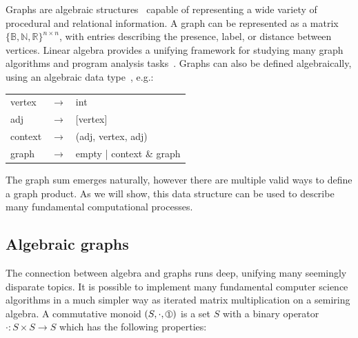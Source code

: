 \documentclass[sigplan,10pt,review,anonymous]{acmart}
\begin{document}
Graphs are algebraic structures~\cite{weisfeiler1968reduction} capable of representing a wide variety of procedural and relational information. A graph can be represented as a matrix $\{\mathbb{B}, \mathbb{N}, \mathbb{R}\}^{n\times n}$, with entries describing the presence, label, or distance between vertices. Linear algebra provides a unifying framework for studying many graph algorithms and program analysis tasks~\citep{kepner2011graph}. Graphs can also be defined algebraically, using an algebraic data type~\cite{erwig2001inductive, mokhov2017algebraic}, e.g.:\\

\begin{center}
\begin{table}[H]
\begin{tabular}{lcl}
  vertex  & $\rightarrow$ & int \\
  adj     & $\rightarrow$ & [vertex] \\
  context & $\rightarrow$ & (adj, vertex, adj) \\
  graph   & $\rightarrow$ & empty | context \& graph \\
\end{tabular}
\end{table}
\end{center}

The graph sum emerges naturally, however there are multiple valid ways to define a graph product. As we will show, this data structure can be used to describe many fundamental computational processes.

\subsection{Algebraic graphs}\label{subsec:algebraic-graphs}

The connection between algebra and graphs runs deep, unifying many seemingly disparate topics. It is possible to implement many fundamental computer science algorithms in a much simpler way as iterated matrix multiplication on a semiring algebra. A commutative monoid $(S, \cdot, \circled{1})$ is a set $S$ with a binary operator $\cdot: S \times S \rightarrow S$ which has the following properties:

\end{document}

